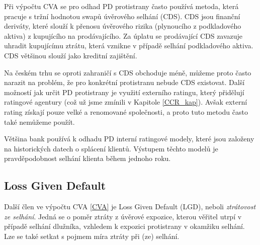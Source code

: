 \documentclass[a4paper,12pt]{report}
\theoremstyle{definition} \newtheorem{definice}[veta]{Definice}
\theoremstyle{remark}
\begin{document}
Při výpočtu CVA se pro odhad PD protistrany často používá metoda, která pracuje s tržní hodnotou swapů úvěrového selhání (CDS).
CDS jsou finanční deriváty, které slouží k přenosu úvěrového rizika (plynoucího z podkladového aktiva) z kupujícího na prodávajícího.
Za úplatu se prodávající CDS zavazuje uhradit kupujícímu ztrátu, která vznikne v případě selhání podkladového aktiva.
CDS většinou slouží jako kreditní zajištění.

Na českém trhu se oproti zahraničí s CDS obchoduje méně, můžeme proto často narazit na problém, že pro konkrétní protistranu nebude CDS existovat.
Další možností jak určit PD protistrany je využití externího ratingu, který přidělují ratingové agentury (což už jsme zmínili v Kapitole \ref{CCR_kap}).
Avšak externí rating získají pouze velké a renomované společnosti, a proto tuto metodu často také nemůžeme použít.

Většina bank používá k odhadu PD interní ratingové modely, které jsou založeny na historických datech o splácení klientů.
Výstupem těchto modelů je pravděpodobnost selhání klienta během jednoho roku.
 




\subsection{Loss Given Default}
Další člen ve výpočtu CVA \eqref{CVA} je Loss Given Default (LGD), neboli \textit{ztrátovost ze selhání}.
Jedná se o poměr ztráty z úvěrové expozice, kterou věřitel utrpí v případě selhání dlužníka, vzhledem k expozici protistrany v okamžiku selhání. 
Lze se také setkat s pojmem míra ztráty při (ze) selhání.
\end{document}
